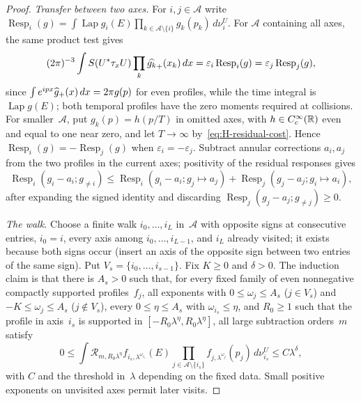 \begin{proof}
\emph{Transfer between two axes.} For $i,j\in\mathcal A$ write $\operatorname{Resp}_i(g)=\int\operatorname{Lap}g_i(E)\prod_{k\in\mathcal A\setminus\{i\}}g_k(p_k)\,d\nu_i^U$. For $\mathcal A$ containing all axes, the same product test gives
\begin{equation*}
(2\pi)^{-3}\int S(U^*\tau_xU)\prod_k\widehat{g_k}_{+}(x_k)\,dx
=\varepsilon_i\operatorname{Resp}_i(g)=\varepsilon_j\operatorname{Resp}_j(g),
\end{equation*}
since $\int e^{ipx}\widehat{g}_{+}(x)\,dx=2\pi g(p)$ for even profiles, while the time integral is $\operatorname{Lap}g(E)$; both temporal profiles have the zero moments required at collisions. For smaller~$\mathcal A$, put $g_k(p)=h(p/T)$ in omitted axes, with $h\in C_c^\infty(\mathbb{R})$ even and equal to one near zero, and let $T\to\infty$ by~\eqref{eq:H-residual-cost}. Hence $\operatorname{Resp}_i(g)=-\operatorname{Resp}_j(g)$ when $\varepsilon_i=-\varepsilon_j$. Subtract annular corrections $a_i,a_j$ from the two profiles in the current axes; positivity of the residual responses gives
\begin{equation}\label{eq:H-sign-transfer}
\operatorname{Resp}_i(g_i-a_i;g_{\ne i})\le
\operatorname{Resp}_i(g_i-a_i;g_j\mapsto a_j)+\operatorname{Resp}_j(g_j-a_j;g_i\mapsto a_i),
\end{equation}
after expanding the signed identity and discarding $\operatorname{Resp}_j(g_j-a_j;g_{\ne j})\ge0$.

\emph{The walk.} Choose a finite walk $i_0,\ldots,i_L$ in~$\mathcal A$ with opposite signs at consecutive entries, $i_0=i$, every axis among $i_0,\ldots,i_{L-1}$, and $i_L$ already visited; it exists because both signs occur (insert an axis of the opposite sign between two entries of the same sign). Put $V_s=\{i_0,\ldots,i_{s-1}\}$. Fix $K\ge0$ and $\delta>0$. The induction claim is that there is $A_s>0$ such that, for every fixed family of even nonnegative compactly supported profiles~$f_j$, all exponents with $0\le\omega_j\le A_s$ ($j\in V_s$) and $-K\le\omega_j\le A_s$ ($j\notin V_s$), every $0\le\eta\le A_s$ with $\omega_{i_s}\le\eta$, and $R_0\ge1$ such that the profile in axis~$i_s$ is supported in $[-R_0\lambda^\eta,R_0\lambda^\eta]$, all large subtraction orders~$m$ satisfy
\begin{equation}\tag{$\mathrm H_s$}\label{eq:H-sign-induction}
0\le\int\mathcal R_{m,R_0\lambda^\eta}f_{i_s,\lambda^{\omega_{i_s}}}(E)
\prod_{j\in\mathcal A\setminus\{i_s\}}f_{j,\lambda^{\omega_j}}(p_j)\,d\nu_{i_s}^U
\le C\lambda^\delta,
\end{equation}
with $C$ and the threshold in~$\lambda$ depending on the fixed data. Small positive exponents on unvisited axes permit later visits.


\end{proof}
